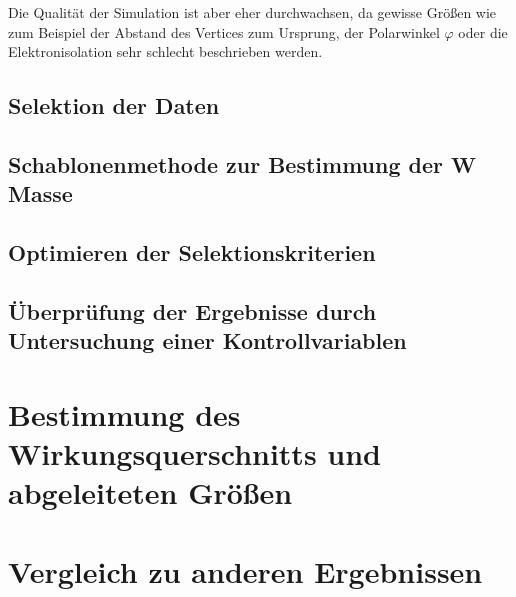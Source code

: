 \documentclass[a4paper,12pt]{article}
\begin{document}
Die Qualität der Simulation ist aber eher durchwachsen, da gewisse Größen wie zum Beispiel der
Abstand des Vertices zum Ursprung, der Polarwinkel $φ$ oder die Elektronisolation sehr schlecht
beschrieben werden.

\subsection{Selektion der Daten}
\subsection{Schablonenmethode zur Bestimmung der W Masse}
\subsection{Optimieren der Selektionskriterien}
\subsection{Überprüfung der Ergebnisse durch Untersuchung einer Kontrollvariablen}

\section{Bestimmung des Wirkungsquerschnitts und abgeleiteten Größen}


\section{Vergleich zu anderen Ergebnissen}




%
\end{document}
